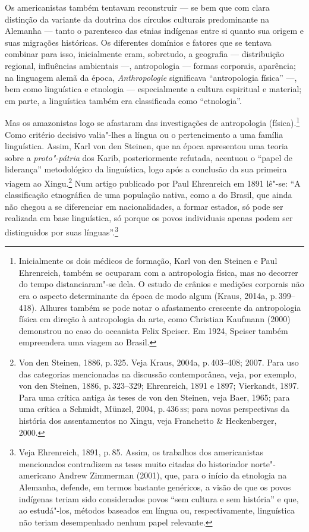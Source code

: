 Os americanistas também tentavam reconstruir --- se bem que com clara
distinção da variante da doutrina dos círculos culturais predominante na
Alemanha --- tanto o parentesco das etnias indígenas entre si quanto sua
origem e suas migrações históricas. Os diferentes domínios e fatores que
se tentava combinar para isso, inicialmente eram, sobretudo, a
geografia --- distribuição regional, influências ambientais ---, antropologia --- formas corporais, aparência; na linguagem alemã da época,
\textit{Anthropologie} significava ``antropologia física'' ---,
bem como linguística e etnologia --- especialmente a
cultura espiritual e material; em parte, a linguística também era
classificada como ``etnologia''.

Mas os amazonistas logo se afastaram das investigações de antropologia
(física).\footnote{Inicialmente os dois médicos de formação, Karl von
  den Steinen e Paul Ehrenreich, também se ocuparam com a antropologia
  física, mas no decorrer do tempo distanciaram"-se dela. O estudo de
  crânios e medições corporais não era o aspecto determinante da época
  de modo algum (Kraus, 2014a, p.\,399--418). Alhures também se pode notar
  o afastamento crescente da antropologia física em direção à
  antropologia da arte, como Christian Kaufmann (2000) demonstrou no
  caso do oceanista Felix Speiser. Em 1924, Speiser também
  empreendera uma viagem ao Brasil.} Como critério decisivo valia"-lhes a
língua ou o pertencimento a uma família linguística. Assim, Karl von den
Steinen, que na época apresentou uma teoria sobre a \textit{proto"-pátria} dos Karib, posteriormente refutada, acentuou o
``papel de liderança'' metodológico da linguística, logo após a
conclusão da sua primeira viagem ao Xingu.\footnote{Von den Steinen,
  1886, p.\,325. Veja Kraus, 2004a, p.\,403--408; 2007. Para uso das
  categorias mencionadas na discussão contemporânea, veja, por exemplo,
  von den Steinen, 1886, p.\,323--329; Ehrenreich, 1891 e 1897; Vierkandt,
  1897. Para uma crítica antiga às teses de von den Steinen, veja Baer,
  1965; para uma crítica a Schmidt, Münzel, 2004, p.\,436\,\textsc{ss}; para
  novas perspectivas da história dos assentamentos no Xingu, veja
  Franchetto \& Heckenberger, 2000.} Num artigo publicado por Paul
Ehrenreich em 1891 lê"-se: ``A classificação etnográfica de uma população
nativa, como a do Brasil, que ainda não chegou a se diferenciar em
nacionalidades, a formar estados, só pode ser realizada em base
linguística, só porque os povos individuais apenas podem ser
distinguidos por suas línguas''.\footnote{Veja Ehrenreich, 1891, p.\,85. Assim,
  os trabalhos dos americanistas mencionados contradizem as teses muito
  citadas do historiador norte"-americano Andrew Zimmerman (2001), que,
  para o início da etnologia na Alemanha, defende, em termos bastante
  genéricos, a visão de que os povos indígenas teriam sido considerados
  povos ``sem cultura e sem história'' e que, ao estudá"-los, métodos
  baseados em língua ou, respectivamente, linguística não teriam
  desempenhado nenhum papel relevante.}

